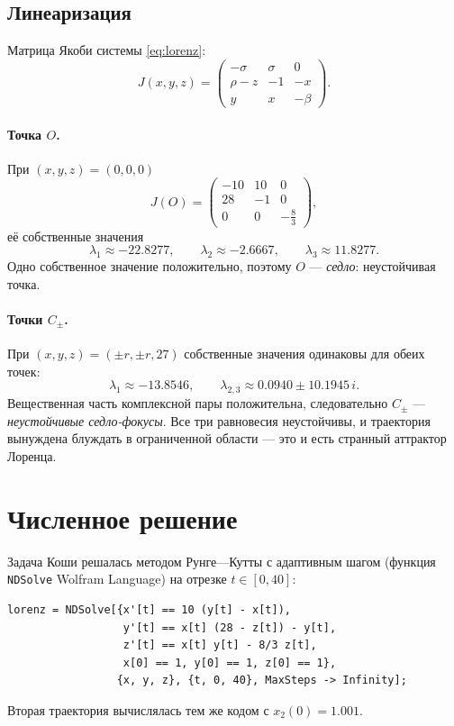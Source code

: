 \documentclass[11pt]{article}
\begin{document}
\subsection{Линеаризация}

Матрица Якоби системы \eqref{eq:lorenz}:
\begin{equation}
J(x,y,z)=
\begin{pmatrix}
-\sigma & \sigma & 0\\
\rho-z & -1 & -x\\
y & x & -\beta
\end{pmatrix}.
\label{eq:jac}
\end{equation}

\paragraph{Точка $O$.}
При $(x,y,z)=(0,0,0)$
\[
J(O)=\begin{pmatrix}-10&10&0\\ 28&-1&0\\ 0&0&-\tfrac83\end{pmatrix},
\]
её собственные значения
\[
\lambda_1\approx-22.8277,\qquad
\lambda_2\approx-2.6667,\qquad
\lambda_3\approx 11.8277.
\]
Одно собственное значение положительно, поэтому $O$ --- \emph{седло}: неустойчивая точка.

\paragraph{Точки $C_{\pm}$.}
При $(x,y,z)=(\pm r,\pm r,27)$ собственные значения одинаковы для обеих точек:
\[
\lambda_1\approx-13.8546,\qquad
\lambda_{2,3}\approx 0.0940\pm 10.1945\,i.
\]
Вещественная часть комплексной пары положительна, следовательно $C_{\pm}$ ---
\emph{неустойчивые седло-фокусы}. Все три равновесия неустойчивы, и траектория вынуждена
блуждать в ограниченной области --- это и есть странный аттрактор Лоренца.

\section{Численное решение}

Задача Коши решалась методом Рунге---Кутты с адаптивным шагом (функция \texttt{NDSolve}
Wolfram Language) на отрезке $t\in[0,40]$:
{\small
\begin{verbatim}
lorenz = NDSolve[{x'[t] == 10 (y[t] - x[t]),
                  y'[t] == x[t] (28 - z[t]) - y[t],
                  z'[t] == x[t] y[t] - 8/3 z[t],
                  x[0] == 1, y[0] == 1, z[0] == 1},
                 {x, y, z}, {t, 0, 40}, MaxSteps -> Infinity];
\end{verbatim}
}
Вторая траектория вычислялась тем же кодом с $x_2(0)=1.001$.
\end{document}
